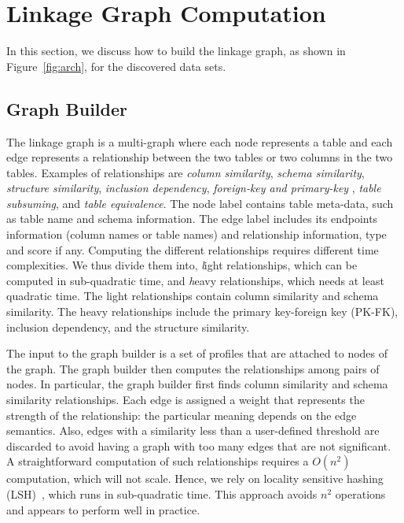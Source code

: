 \section{Linkage Graph Computation}
\label{sec:stitching}
In this section, we
discuss how to build the linkage graph, as shown in Figure~\ref{fig:arch}, for the discovered data sets.

\subsection{Graph Builder}
\label{subsec:graphbuild}

The linkage graph is a multi-graph where each node represents a table and each
edge represents a relationship between the two tables or two columns in the two tables. 
Examples of relationships are 
\emph{column similarity}, 
\emph{schema similarity}, 
\emph{structure similarity}, %
\emph{inclusion dependency}, 
\emph{foreign-key and primary-key} , 
\emph{table subsuming}, and 
\emph{table equivalence}. 
The node label contains table meta-data, such as table name and schema information. 
The edge label includes its endpoints information (column names or table names) and
relationship information, \eg type and score if any. 
Computing the different relationships requires different time complexities.
We thus divide them into, {\textit light relationships}, which can be computed in sub-quadratic time,
and {\textit heavy relationships}, which needs at least quadratic time. 
The light relationships contain column similarity and schema similarity. 
The heavy relationships include the primary key-foreign key (PK-FK), inclusion dependency, and the structure similarity. 


The input to the graph builder is a set of profiles that are attached to nodes of the graph. 
The graph builder then computes the relationships  among pairs of nodes. 
In particular, the graph builder first finds column similarity and schema similarity relationships. 
Each edge is assigned a weight that represents the strength of the relationship: the particular meaning depends on the edge semantics.  
Also, edges with a similarity less than a user-defined threshold are discarded to avoid having a graph with too many edges that are not significant. 
A straightforward computation of such relationships requires a $O(n^2)$ computation, which will not scale.  
Hence, we rely on locality sensitive hashing (LSH)~\cite{DBLP:conf/compgeom/DatarIIM04}, which runs in sub-quadratic time. This approach avoids $n^2$ operations and appears to perform well in practice.


